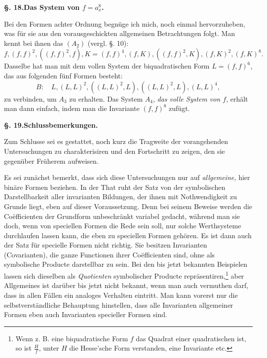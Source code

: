 \documentclass[10pt]{article}
\begin{document}
\begin{center}
{\bfseries §. 18.\quad Das System von $f=a_x^8$.}
\end{center}

Bei den Formen achter Ordnung begnüge ich mich, noch einmal hervorzuheben, was für sie aus den vorausgeschickten allgemeinen Betrachtungen folgt. Man kennt bei ihnen das $(A_2)$ (vergl. §. 10):
\[
f,(f,f)^2,((f,f)^2,f),K=(f,f)^4,(f,K),((f,f)^2,K),(f,K)^2,(f,K)^8.
\]
Dasselbe hat man mit dem vollen System der biquadratischen Form $L=(f,f)^6$, das aus folgenden fünf Formen besteht:
\[
B:
\quad L,(L,L)^2,((L,L)^2,L),((L,L)^2,L),(L,L)^4,
\]
zu verbinden, um $A_3$ zu erhalten. Das System $A_4$, \textit{das volle System von $f$}, erhält man dann einfach, indem man die Invariante $(f,f)^8$ zufügt.

\begin{center}
{\bfseries §. 19.\quad Schlussbemerkungen.}
\end{center}

Zum Schlusse sei es gestattet, noch kurz die Tragweite der vorangehenden Untersuchungen zu charakterisiren und den Fortschritt zu zeigen, den sie gegenüber Früherem aufweisen.

Es sei zunächst bemerkt, dass sich diese Untersuchungen nur auf \textit{allgemeine,} hier binäre Formen beziehen. In der That ruht der Satz von der symbolischen Darstellbarkeit aller invarianten Bildungen, der ihnen mit Nothwendigkeit zu Grunde liegt, eben auf dieser Voraussetzung. Denn bei seinem Beweise werden die Coëfficienten der Grundform unbeschränkt variabel gedacht, während man sie doch, wenn von speciellen Formen die Rede sein soll, nur solche Werthsysteme durchlaufen lassen kann, die eben zu speciellen Formen gehören. Es ist dann auch der Satz für specielle Formen nicht richtig. Sie besitzen Invarianten (Covarianten), die ganze Functionen ihrer Coëfficienten sind, ohne als symbolische Producte darstellbar zu sein. Bei den bis jetzt bekannten Beispielen lassen sich dieselben als \textit{Quotienten} symbolischer Producte repräsentiren,\footnote{Wenn z. B. eine biquadratische Form $f$ das Quadrat einer quadratischen ist, so ist $\frac{H}{f}$, unter $H$ die Hesse'sche Form verstanden, eine Invariante etc.} aber Allgemeines ist darüber bis jetzt nicht bekannt, wenn man auch vermuthen darf, dass in allen Fällen ein analoges Verhalten eintritt. Man kann vorerst nur die selbstverständliche Behauptung hinstellen, dass alle Invarianten allgemeiner Formen eben auch Invarianten specieller Formen sind.
\end{document}
